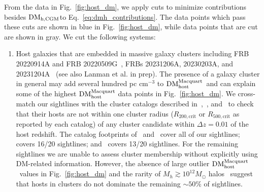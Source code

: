 \documentclass[twocolumn,linenumbers]{aastex631}
\newcommand{\dmhm}{\ensuremath{{\rm DM}_\textrm{host}^\textrm{Macquart}}}
\newcommand{\dmhcgm}{\ensuremath{{\rm DM}_\textrm{h,CGM}}}
\begin{document}
From the data in Fig.~\ref{fig:host_dm}, we apply cuts to minimize contributions besides \dmhcgm to Eq.~\ref{eq:dmh_contributions}. The data points which pass these cuts are shown in blue in Fig.~\ref{fig:host_dm}, while data points that are cut are shown in gray. We cut the following systems:
\begin{enumerate}
    \item Host galaxies that are embedded in massive galaxy clusters including FRB 20220914A and FRB 20220509G~\citep{connor2023deep}, FRBs 20231206A, 20230203A, and 20231204A~\citep{chime2025catalog} (see also Lanman et al. in prep). The presence of a galaxy cluster in general may add several hundred pc cm$^{-3}$ to \dmhm\ and can explain some of the highest $\dmhm$ data points in Fig.~\ref{fig:host_dm}. We cross-match our sightlines with the cluster catalogs described in~\citet{tempel2018bayesian},~\citet{wen2018catalogue}, and~\citet{xu2022catalog} to check that their hosts are not within one cluster radius ($R_\mathrm{200,crit}$ or $R_\mathrm{500,crit}$ as reported by each catalog) of any cluster candidate within $\Delta z = 0.01$ of the host redshift. 
    The catalog footprints of~\citet{tempel2018bayesian} and~\citet{bahk2024galaxy} cover all of our sightlines;~\citet{xu2022catalog} covers 16/20 sightlines; and~\citet{wen2018catalogue} covers 13/20 sightlines.
    For the remaining sightlines we are unable to assess cluster membership without explicitly using DM-related information. However, the absence of large outlier \dmhm\ values in Fig.~\ref{fig:host_dm} and the rarity of $M_h \gtrsim 10^{12} M_\odot$ halos~\citep{mcquinn2014locating} suggest that hosts in clusters do not dominate the remaining $\sim 50\%$ of sightlines. 
    

\end{enumerate}
\end{document}
